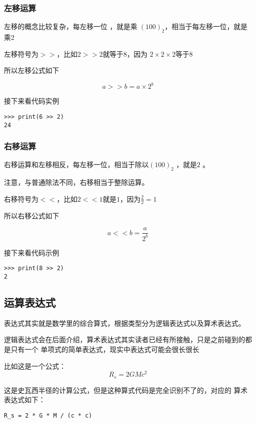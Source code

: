 \documentclass{book}
\begin{document}
\subsubsection{左移运算}
\indent 左移的概念比较复杂，每左移一位
，就是乘 $(100)_2$，相当于每左移一位，就是乘2


左移符号为$>>$，比如$2 >> 2$就等于$8$，因为
$2 \times 2 \times 2$等于8


所以左移公式如下


\begin{equation}
a >> b = a \times 2 ^ b
\end{equation}


接下来看代码实例

\begin{verbatim}
>>> print(6 >> 2)
24
\end{verbatim}
\subsubsection{右移运算}
\indent 右移运算和左移相反，每左移一位，相当于除以$(100)_2$
，就是$2$ 。


注意，与普通除法不同，右移相当于整除运算。


右移符号为$<<$，比如$2 << 1$就是$1$，因为$\frac{2}{2} = 1$


所以右移公式如下


\begin{equation}
a << b = \frac{a}{2^b}
\end{equation}


接下来看代码示例
\begin{verbatim}
>>> print(8 >> 2)
2
\end{verbatim}

\subsection{运算表达式}
\indent 表达式其实就是数学里的综合算式，根据类型分为逻辑表达式以及算术表达式。


逻辑表达式会在后面介绍，算术表达式其实读者已经有所接触，只是之前碰到的都是只有一个
单项式的简单表达式，现实中表达式可能会很长很长


比如这是一个公式：
\begin{equation}
R_s = {2GM}{c^2}
\end{equation}


这是史瓦西半径的计算公式，但是这种算式代码是完全识别不了的，对应的
算术表达式如下：

\begin{verbatim}
R_s = 2 * G * M / (c * c)
\end{verbatim}
\end{document}
